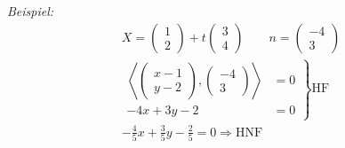 \documentclass[%
a4paper,
10pt,           %
]
{scrartcl}
\theoremstyle{plain}
\theoremstyle{plain}
\theoremstyle{plain}
\theoremstyle{plain}
\theoremstyle{plain}
\begin{document}
\textit{Beispiel:}
\begin{align*}
    X =
    \begin{pmatrix}
        1\\2
    \end{pmatrix}
    + t
    \begin{pmatrix}
        3\\4
    \end{pmatrix}
    \qquad n =
    \begin{pmatrix}
        -4\\3
    \end{pmatrix}\\
    \left.
    \begin{matrix}
        \left\langle
        \begin{pmatrix}
            x-1\\y-2
        \end{pmatrix}
        ,
        \begin{pmatrix}
            -4\\3
        \end{pmatrix}
        \right\rangle
        & =0\\
        -4x+3y-2 & =0
    \end{matrix}
    \right\}
    \text{HF}\\
    -\frac{4}{5} x + \frac{3}{5} y - \frac{2}{5} = 0 \Rightarrow \text{HNF}
\end{align*}
\end{document}
